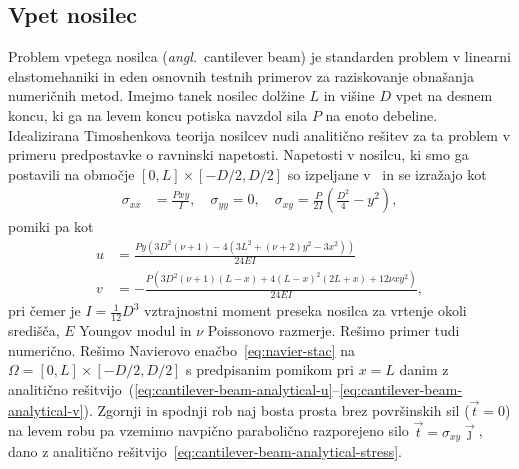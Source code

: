 \documentclass[12pt,a4paper,twoside]{article}
\theoremstyle{definition} %
\theoremstyle{plain} %
\numberwithin{equation}{section}
\newcommand{\vt}{\vec{t}}
\newcommand{\vj}{\vec{\jmath}}
\newcommand{\ts}{\sigma}
\newcommand{\ang}[1]{(\textit{angl.}\ #1)}
\begin{document}
\subsection{Vpet nosilec}
Problem vpetega nosilca \ang{cantilever beam} je standarden problem v linearni elastomehaniki in eden
osnovnih testnih primerov za raziskovanje obnašanja numeričnih metod. Imejmo tanek nosilec dolžine
$L$ in višine $D$ vpet na desnem koncu, ki ga na levem koncu potiska navzdol sila $P$ na enoto
debeline. Idealizirana Timoshenkova teorija nosilcev nudi analitično rešitev za ta problem v primeru
predpostavke o ravninski napetosti. Napetosti v nosilcu, ki smo ga postavili na območje $[0, L]
\times [-D/2, D/2]$ so izpeljane v~\cite[str.\ 284--289, enačba 7.4.55]{slaughter2012linearized} in
se izražajo kot
\begin{align}
  \ts_{xx} &= \frac{Pxy}{I}, \quad \ts_{yy} = 0, \quad \ts_{xy} = \frac{P}{2I} \left( \frac{D^2}{4}
  - y^2 \right),
  \label{eq:cantilever-beam-analytical-stress}
\end{align}
pomiki pa kot
\begin{align}
  u &= \frac{P y \left(3 D^2 (\nu +1)-4 \left(3 L^2+(\nu +2) y^2-3 x^2\right)\right)}{24 E I}
  \label{eq:cantilever-beam-analytical-u} \\
  v &= -\frac{P \left(3 D^2 (\nu +1) (L-x)+4 (L-x)^2 (2 L+x)+12 \nu  x y^2\right)}{24 E I}, \label{eq:cantilever-beam-analytical-v}
\end{align}
pri čemer je $I = \frac{1}{12} D^3$ vztrajnostni moment preseka nosilca za vrtenje okoli središča,
$E$ Youngov modul in $\nu$ Poissonovo razmerje. Rešimo primer tudi numerično. Rešimo Navierovo
enačbo~\eqref{eq:navier-stac} na $\Omega = [0, L] \times [-D/2, D/2]$ s predpisanim pomikom pri $x =
L$ danim z analitično
rešitvijo~(\ref{eq:cantilever-beam-analytical-u}--\ref{eq:cantilever-beam-analytical-v}).  Zgornji
in spodnji rob naj bosta prosta brez površinskih sil ($\vt = 0$) na levem robu pa vzemimo navpično
parabolično razporejeno silo $\vt = \ts_{xy}\vj$, dano z analitično
rešitvijo~\eqref{eq:cantilever-beam-analytical-stress}.
\end{document}
